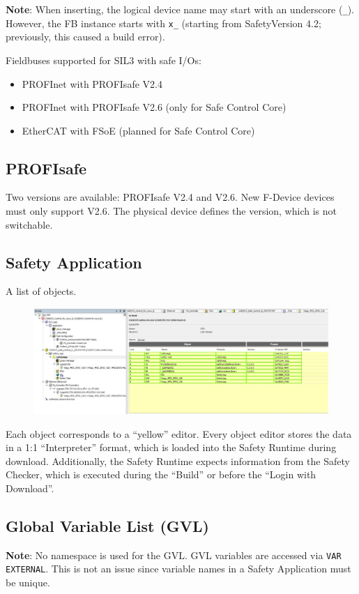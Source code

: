 \documentclass[a4paper,12pt]{article}
\begin{document}
\textbf{Note}: When inserting, the logical device name may start with an underscore (\texttt{\_}). However, the FB instance starts with \texttt{x\_} (starting from SafetyVersion 4.2; previously, this caused a build error).

Fieldbuses supported for SIL3 with safe I/Os:
\begin{itemize}
	\item PROFInet with PROFIsafe V2.4
	\item PROFInet with PROFIsafe V2.6 (only for Safe Control Core)
	\item EtherCAT with FSoE (planned for Safe Control Core)
\end{itemize}

\subsection{PROFIsafe}
Two versions are available: PROFIsafe V2.4 and V2.6. New F-Device devices must only support V2.6. The physical device defines the version, which is not switchable.

\subsection{Safety Application}
A list of objects.
\begin{figure}[H]
	\centering
	\includegraphics[width=1\textwidth]{24.JPG}
\end{figure}
Each object corresponds to a ``yellow'' editor. Every object editor stores the data in a 1:1 ``Interpreter'' format, which is loaded into the Safety Runtime during download. Additionally, the Safety Runtime expects information from the Safety Checker, which is executed during the ``Build'' or before the ``Login with Download''.

\subsection{Global Variable List (GVL)}
\textbf{Note}: No namespace is used for the GVL. GVL variables are accessed via \texttt{VAR EXTERNAL}. This is not an issue since variable names in a Safety Application must be unique.
\end{document}
